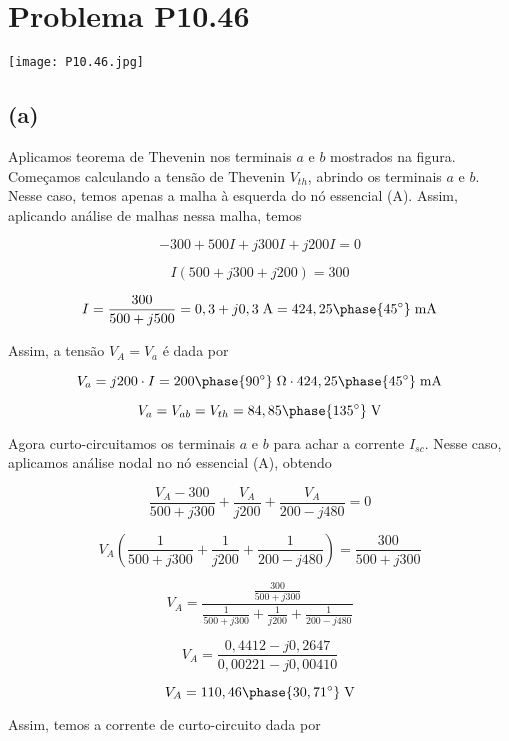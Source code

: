 
\section*{Problema P10.46}

\renewcommand*\thesection{10.46}

\begin{center}
    \texttt{[image: P10.46.jpg]}
\end{center}

\subsection*{(a)}

Aplicamos teorema de Thevenin nos terminais $a$ e $b$ mostrados na figura. \\
Começamos calculando a tensão de Thevenin $V_{th}$, abrindo os terminais $a$ e $b$. Nesse caso, temos apenas a malha à esquerda
do nó essencial (A). Assim, aplicando análise de malhas nessa malha, temos

\[ -300 + 500I + j300I + j200I = 0 \]

\[ I(500 + j300 + j200) = 300 \]

\[ I = \frac{300}{500 + j500} = 0,3 + j0,3 \;\textrm{A} = 424,25\phase{45^{\circ}} \;\textrm{mA}\]

Assim, a tensão $V_A = V_a$ é dada por   

\[ V_a = j200 \cdot I = 200\phase{90^{\circ}} \;\Omega \cdot 424,25\phase{45^{\circ}} \;\textrm{mA}\]

\[ V_a = V_{ab} = V_{th} = 84,85\phase{135^{\circ}} \;\textrm{V}\]

Agora curto-circuitamos os terminais $a$ e $b$ para achar a corrente $I_{sc}$. Nesse caso, aplicamos análise nodal no nó
essencial (A), obtendo

\[ \frac{V_A - 300}{500 + j300} + \frac{V_A}{j200} + \frac{V_A}{200 - j480} = 0 \]

\[ V_A\left(\frac{1}{500 + j300} + \frac{1}{j200} + \frac{1}{200 - j480}\right) = \frac{300}{500 + j300} \]

\[ V_A = \frac{\frac{300}{500 + j300}}{\frac{1}{500 + j300} + \frac{1}{j200} + \frac{1}{200 - j480}} \]

\[ V_A = \frac{0,4412 - j0,2647}{0,00221 - j0,00410} \]

\[ V_A = 110,46\phase{30,71^{\circ}} \;\textrm{V} \]

Assim, temos a corrente de curto-circuito dada por


